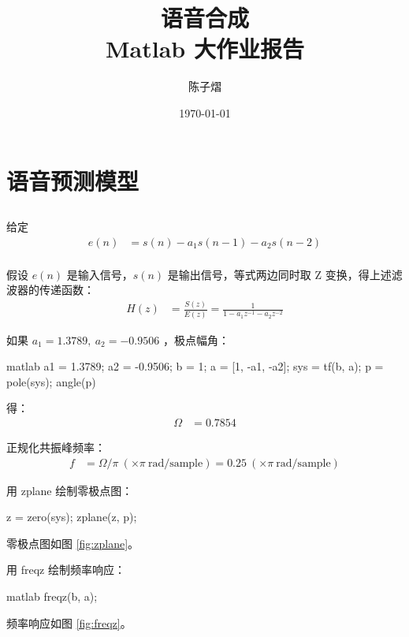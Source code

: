 \documentclass[a4paper]{article}  %
\begin{document}
\title{\textbf{语音合成}\\Matlab 大作业报告}  %
\author{陈子熠}
\date{\today}
\maketitle

\tableofcontents

\newpage

\section{语音预测模型}

\subsection{}

给定
\begin{align*}
    e(n) &= s(n) - a_1s(n-1) - a_2s(n-2) \\
\end{align*}

假设 $e(n)$ 是输入信号，$s(n)$ 是输出信号，等式两边同时取 Z 变换，得上述滤波器的传递函数：
\begin{align*}
    H(z) &= \frac{S(z)}{E(z)} = \frac{1}{1 - a_1z^{-1} - a_2z^{-2}}
\end{align*}

如果 $a_1 = 1.3789,\ a_2 = −0.9506$ ，极点幅角：
\begin{codeblock}{matlab}
    a1 = 1.3789;
    a2 = -0.9506;
    b = 1;
    a = [1, -a1, -a2];
    sys = tf(b, a);
    p = pole(sys);
    angle(p)
\end{codeblock}
得：
\begin{align*}
    \Omega &= 0.7854
\end{align*}

正规化共振峰频率：
\begin{align*}
    f &= \Omega / \pi\ (\times \pi\ \text{rad/sample}) = 0.25\ (\times \pi\ \text{rad/sample})
\end{align*}

用 zplane 绘制零极点图：
\begin{codeblock}
    z = zero(sys);
    zplane(z, p);
\end{codeblock}
零极点图如图 \ref{fig:zplane}。

用 freqz 绘制频率响应：
\begin{codeblock}{matlab}
    freqz(b, a);
\end{codeblock}
频率响应如图 \ref{fig:freqz}。
\end{document}

